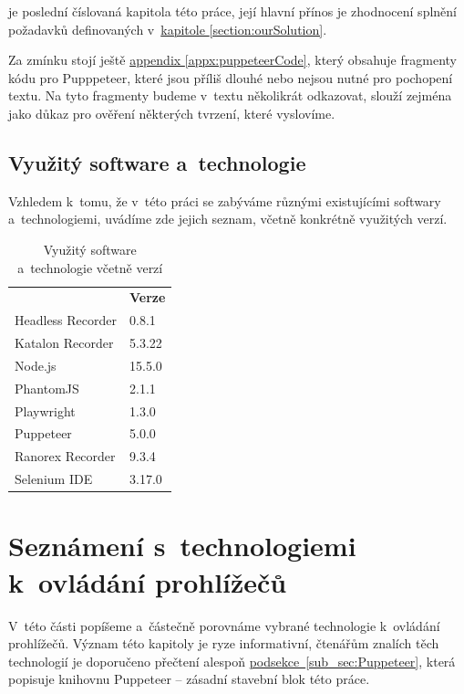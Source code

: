 \documentclass[12pt, a4paper, twoside]{article}
\newcommand{\refAddedText}[3]{\hyperref[#1]{#2\ref{#1}#3}}
\newcommand*{\fullNameref}[1]{\hyperref[{#1}]{\ref{#1}~\nameref{#1}}}
\begin{document}
	 je poslední číslovaná kapitola této práce, její hlavní přínos je zhodnocení splnění požadavků definovaných v~\hyperref[section:ourSolution]{kapitole \ref{section:ourSolution}}.
	
	Za zmínku stojí ještě \hyperref[appx:puppeteerCode]{appendix \ref{appx:puppeteerCode}}, který obsahuje fragmenty kódu pro Pupppeteer, které jsou příliš dlouhé nebo nejsou nutné pro pochopení textu. Na tyto fragmenty budeme v~textu několikrát odkazovat, slouží zejména jako důkaz pro ověření některých tvrzení, které vyslovíme.
	
	\subsection{Využitý software a~technologie}
	Vzhledem k~tomu, že v~této práci se zabýváme různými existujícími softwary a~technologiemi, uvádíme zde jejich seznam, včetně konkrétně využitých verzí.
	\begin{table}[H]
	\centering
	\begin{tabular}{ l|l } 
		\rowcolor{tableHeadingBackground}
		\multicolumn{1}{l}{\textbf{Název}} & \multicolumn{1}{l}{\textbf{Verze}} \\
		Headless Recorder & 0.8.1 \\ 
		Katalon Recorder & 5.3.22 \\ 
		Node.js & 15.5.0\\
		PhantomJS & 2.1.1 \\
		Playwright & 1.3.0  \\
		Puppeteer & 5.0.0 \\
		Ranorex Recorder & 9.3.4 \\
		Selenium IDE & 3.17.0 \\
	\end{tabular}
	\caption{Využitý software a~technologie včetně verzí}
\end{table}
	\section{Seznámení s~technologiemi k~ovládání prohlížečů}
	\label{section:introToBrowserAut}
	V~této části popíšeme a~částečně porovnáme vybrané technologie k~ovládání prohlížečů. Význam této kapitoly je ryze informativní, čtenářům znalích těch technologií je doporučeno přečtení alespoň \refAddedText{sub_sec:Puppeteer}{podsekce~}{}, která popisuje knihovnu Puppeteer -- zásadní stavební blok této práce.
\end{document}
